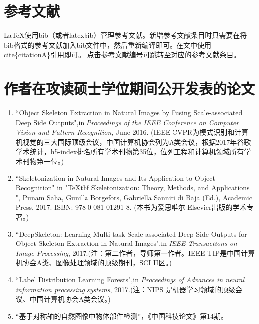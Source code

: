 \documentclass[UTF8, fontset=windows]{ctexart}
\numberwithin{equation}{section} %
\numberwithin{table}{section} %
\begin{document}
\section{参考文献}
\LaTeX 使用bib（或者latexbib）管理参考文献。新增参考文献条目时只需要在将bib格式的参考文献加入bib文件中，然后重新编译即可。在文中使用cite\{citationA\}引用即可。
点击参考文献编号\cite{shen2017deepskeleton}可跳转至对应的参考文献条目。

\pagebreak
{} %



\pagebreak
{} %
\section*{作者在攻读硕士学位期间公开发表的论文}
\begin{enumerate}
\item “Object Skeleton Extraction in Natural Images by Fusing Scale-associated Deep Side Outputs",in \emph{Proceedings of the IEEE Conference on Computer Vision and Pattern Recognition}, June 2016.
(IEEE CVPR为模式识别和计算机视觉的三大国际顶级会议，中国计算机协会列为A类会议，根据2017年谷歌学术统计，h5-index排名所有学术刊物第35位，位列工程和计算机领域所有学术刊物第一位。)

\item “Skeletonization in Natural Images and Its Application to Object Recognition" in "\TeX tbf{ Skeletonization: Theory, Methods, and Applications }", Punam Saha, Gunilla Borgefors, Gabriella Sanniti di Baja (Ed.), 
Academic Press, 2017. ISBN: 978-0-081-01291-8. (本书为爱思唯尔 Elsevier出版的学术专著。)

\item “DeepSkeleton: Learning Multi-task Scale-associated Deep Side Outputs for Object Skeleton Extraction in Natural Images",in \emph{IEEE Transactions on Image Processing}, 2017.(注：第二作者，导师第一作者。IEEE TIP是中国计算机协会A类、图像处理领域的顶级期刊，SCI II区。)

\item “Label Distribution Learning Forests",in \emph{Proceedings of Advances in neural information processing systems}, 2017.(注：NIPS 是机器学习领域的顶级会议、中国计算机协会A类会议。)

\item “基于对称轴的自然图像中物体部件检测”，《中国科技论文》第14期。

\end{enumerate}
\end{document}
